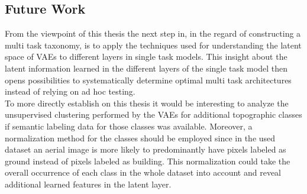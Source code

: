 \subsection{Future Work}

From the viewpoint of this thesis the next step in, in the regard of constructing a multi task taxonomy, is to apply
the techniques used for understanding the latent space of VAEs to different layers in single task models. This insight
about the latent information learned in the different layers of the single task model then opens possibilities
to systematically determine optimal multi task architectures instead of relying on ad hoc testing.\\

To more directly establish on this thesis it would be interesting to analyze the unsupervised clustering performed by
the VAEs for additional topographic classes if semantic labeling data for those classes was available.
Moreover, a normalization method for the classes should be employed since in the used dataset an aerial
image is more likely to predominantly have pixels labeled as ground instead of pixels labeled as building.
This normalization could take the overall occurrence of each class in the whole dataset into account and reveal
additional learned features in the latent layer.


